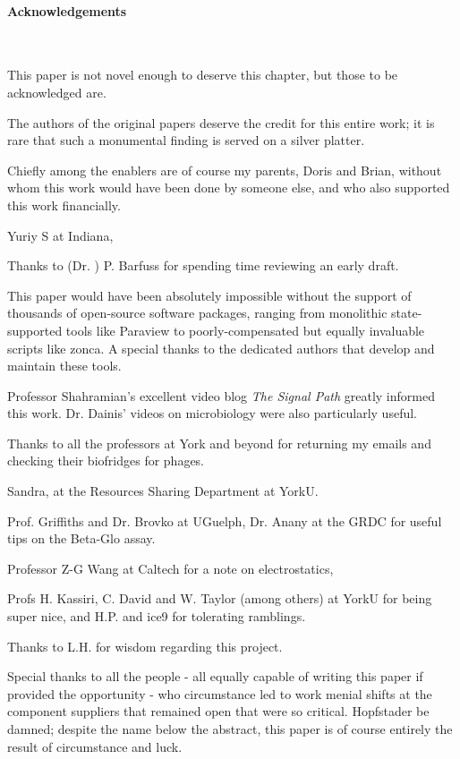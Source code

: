 \documentclass[paper.tex]{subfiles}
\begin{document}
	
\clearpage
\paragraph{Acknowledgements}\

This paper is not novel enough to deserve this chapter, but those to be acknowledged are.

The authors of the original papers deserve the credit for this entire work; it is rare that such a monumental finding is served on a silver platter.

Chiefly among the enablers are of course my parents, Doris and Brian, without whom this work would have been done by someone else, and who also supported this work financially. 

Yuriy S at Indiana, 

Thanks to (Dr. ) P. Barfuss for spending time reviewing an early draft.

This paper would have been absolutely impossible without the support of thousands of open-source software packages, ranging from monolithic state-supported tools like Paraview to poorly-compensated but equally invaluable scripts like zonca. A special thanks to the dedicated authors that develop and maintain these tools.

Professor Shahramian's excellent video blog {\it The Signal Path} greatly informed this work. Dr. Dainis' videos on microbiology were also particularly useful.

Thanks to all the professors at York and beyond for returning my emails and checking their biofridges for phages.

Sandra, at the Resources Sharing Department at YorkU.

Prof. Griffiths and Dr. Brovko at UGuelph, Dr. Anany at the GRDC for useful tips on the Beta-Glo assay.

Professor Z-G Wang at Caltech for a note on electrostatics, 

Profs H. Kassiri, C. David and W. Taylor (among others) at YorkU for being super nice, and H.P. and ice9 for tolerating ramblings.

Thanks to L.H. for wisdom regarding this project.

Special thanks to all the people - all equally capable of writing this paper if provided the opportunity - who circumstance led to work menial shifts at the component suppliers that remained open that were so critical. Hopfstader be damned; despite the name below the abstract, this paper is of course entirely the result of circumstance and luck. 
\end{document}
